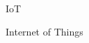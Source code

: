 \documentclass[twoside,english,brazilian]{UNISINOSmonografia}
\begin{document}




%


%
\begin{listadesiglas}{IoT}
\item[IoT] Internet of Things
\end{listadesiglas}


%


\tableofcontents
\end{document}
